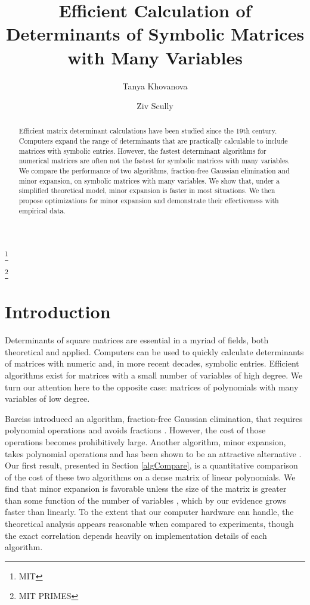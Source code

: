 \documentclass[12pt]{amsart}
\numberwithin{equation}{section}
\numberwithin{figure}{section}
\begin{document}
\title[Determinants with Many Variables]{Efficient Calculation of Determinants of Symbolic Matrices with Many Variables}
\author[Tanya Khovanova]{Tanya Khovanova}\thanks{MIT}
\author[Ziv Scully]{Ziv Scully}\thanks{MIT PRIMES}
\begin{abstract}
Efficient matrix determinant calculations have been studied since the 19th century. Computers expand the range of determinants that are practically calculable to include matrices with symbolic entries. However, the fastest determinant algorithms for numerical matrices are often not the fastest for symbolic matrices with many variables. We compare the performance of two algorithms, fraction-free Gaussian elimination and minor expansion, on symbolic matrices with many variables. We show that, under a simplified theoretical model, minor expansion is faster in most situations. We then propose optimizations for minor expansion and demonstrate their effectiveness with empirical data.
\end{abstract}
\maketitle


\section{Introduction}
Determinants of square matrices are essential in a myriad of fields, both theoretical and applied. Computers can be used to quickly calculate determinants of matrices with numeric and, in more recent decades, symbolic entries. Efficient algorithms exist for matrices with a small number of variables of high degree. We turn our attention here to the opposite case: matrices of polynomials with many variables of low degree.

Bareiss introduced an algorithm, fraction-free Gaussian elimination, that requires  polynomial operations and avoids fractions \cite{bareiss}. However, the cost of those operations becomes prohibitively large. Another algorithm, minor expansion, takes  polynomial operations and has been shown to be an attractive alternative \cite{gentleman-johnson}. Our first result, presented in Section \ref{algCompare}, is a quantitative comparison of the cost of these two algorithms on a dense matrix of linear polynomials. We find that minor expansion is favorable unless the size of the matrix is greater than some function  of the number of variables , which by our evidence grows faster than linearly. To the extent that our computer hardware can handle, the theoretical analysis appears reasonable when compared to experiments, though the exact correlation depends heavily on implementation details of each algorithm.
\end{document}
